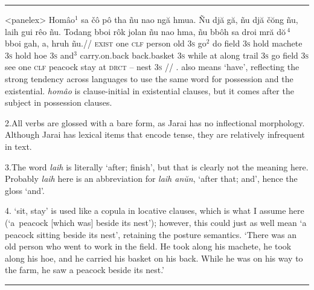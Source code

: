 \documentclass[12pt]{article}
\begin{document}
\filbreak\hrule\medskip

\begingroup
\ex[everypanel=\footnotesize]<panelex>
\let\\=\textsc
\beginglpanel[ssratio=.5,glhangstyle=none]
\gla Hom\^{a}o$^1$ sa \v{c}\^{o} p\^{o} tha  \~{n}u nao ng\u{a}
hmua. \~{N}u dj\u{a} g\u{a}, \~{n}u dj\u{a} \v{c}\u{o}ng \~{n}u,
laih gui r\^{e}o \~{n}u. Todang bboi r\^{o}k jolan \~{n}u nao
hma, \~{n}u bb\^{o}h sa droi mr\u{a} d\u{o}$\,^4$ bboi gah, a, hruh
\~{n}u.//
\glb \\{exist} one \\{clf} person old \\{3s} go$^2$ do field
\\{3s} hold machete \\{3s} hold hoe \\{3s} and$^3$ carry.on.back
back.basket \\{3s} while at along trail \\{3s} go field \\{3s}
see one \\{clf} peacock stay at \\{drct} -- nest \\{3s}
//
. also means `have', reflecting the
strong tendency across languages to use the same word for
possession and the existential. {\it hom\^{a}o} is clause-initial
in existential clauses, but it comes after the subject in
possession clauses.

2.\enspace All verbs are glossed with a bare form, as Jarai has
no inflectional morphology. Although Jarai has lexical items that
encode tense, they are relatively infrequent in text.

3.\enspace The word {\it laih} is literally `after; finish', but
that is clearly not the meaning here. Probably {\it laih} here is
an abbreviation for {\it laih an\u{u}n}, `after that; and', hence
the gloss `and'.

4. `sit, stay' is used like a copula in
locative clauses, which is what I assume here (`a~peacock
[which was] beside its nest'); however, this could just as well
mean `a peacock sitting beside its nest', retaining the posture
semantics.
\endpanel
\bigskip
`There was an old person who went to work in the field. He took
along his machete, he took along his hoe, and he carried his
basket on his back. While he was on his way to the farm, he saw a
peacock beside its nest.'
\xe
\endgroup
\bigskip

\filbreak\hrule\medskip
\end{document}
